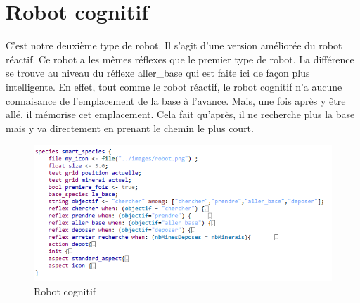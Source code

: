 
\section{Robot cognitif }
C’est notre deuxième type de robot. Il s'agit d'une version améliorée du robot réactif. Ce robot a les mêmes réflexes que le premier type de robot. La différence se trouve au niveau du réflexe aller\_base qui est faite ici de façon plus intelligente. En effet, tout comme le robot réactif, le robot cognitif n'a aucune connaisance de l'emplacement de la base à l'avance. Mais, une fois après y être allé, il mémorise cet emplacement. Cela fait qu'après, il ne recherche plus la base mais y va directement en prenant le chemin le plus court.
\begin{figure}[!h]
	\begin{center}
		\includegraphics{code/robot_cognitif}
	\end{center}
	\caption{Robot cognitif}
\end{figure}
